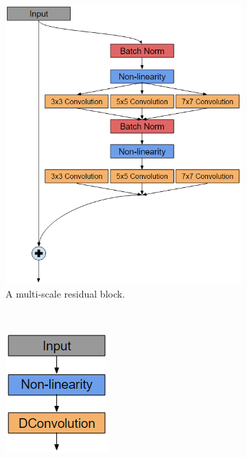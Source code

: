 \begin{figure}
\begin{subfigure}[b]{0.59\textwidth}
        \includegraphics[width=\textwidth]{figures/multiscale.png}
				\caption{A multi-scale residual block.}
        \label{f:multi}
    \end{subfigure}
    \\
    \begin{subfigure}[b]{0.25\textwidth}
        \centering
        \includegraphics[width=\textwidth]{figures/dconv.png}

\end{subfigure}
\end{figure}
